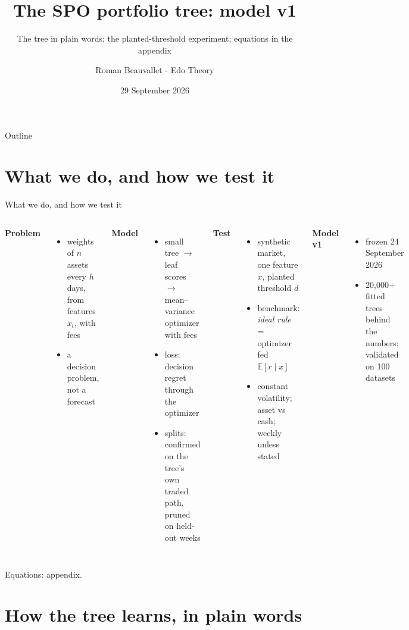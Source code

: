 \documentclass[10pt,aspectratio=169]{beamer}
\title{The SPO portfolio tree: model v1}
\subtitle{The tree in plain words; the planted-threshold experiment; equations in the appendix}
\author{Roman Beauvallet - Edo Theory}
\date{29 September 2026}
\newcommand{\1}{\mathbf{1}}
\newcommand{\E}{\mathbb{E}}
\begin{document}
\begin{frame}[plain]
\titlepage
\end{frame}

\begin{frame}{Outline}
\tableofcontents
\end{frame}

\section{What we do, and how we test it}
\begin{frame}{What we do, and how we test it}
\begin{columns}[T]
\textbf{Problem}
\begin{itemize}
\item weights of $n$ assets every $h$ days, from features $x_t$, with fees
\item a decision problem, not a forecast
\end{itemize}
\medskip
\textbf{Model}
\begin{itemize}
\item small tree $\to$ leaf scores $\to$ mean--variance optimizer with fees
\item loss: decision regret through the optimizer
\item splits: confirmed on the tree's own traded path, pruned on held-out weeks
\end{itemize}
\textbf{Test}
\begin{itemize}
\item synthetic market, one feature $x$, planted threshold $d$
\item benchmark: \emph{ideal rule} = optimizer fed $\E[r\mid x]$
\item constant volatility; asset vs cash; weekly unless stated
\end{itemize}
\medskip
\textbf{Model v1}
\begin{itemize}
\item frozen 24 September 2026
\item 20{,}000+ fitted trees behind the numbers; validated on 100 datasets
\end{itemize}
\end{columns}
\medskip
\centering\small Equations: appendix.
\end{frame}

\section{How the tree learns, in plain words}
\end{document}
